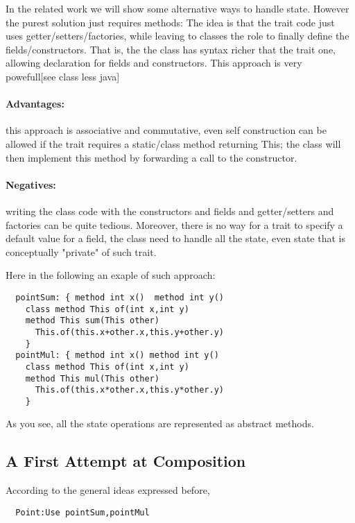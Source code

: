 In the related work we will show some alternative ways to handle state.
However the purest solution just requires methods:
  The idea is that
  the trait code just uses getter/setters/factories, while leaving
  to classes the role to finally define the fields/constructors.
  That is, the  the class has syntax richer that the trait one,
  allowing declaration for fields and constructors.
  This approach is very powefull[see class less java]
 
\paragraph*{Advantages:} 
this approach is associative and commutative, even self construction
  can be allowed if the trait requires a static/class method
  returning This; the class will then implement this method by forwarding
  a call to the constructor.
  
\paragraph*{Negatives:} writing the class code with the constructors and
   fields and getter/setters and factories can be quite tedious.
   Moreover, there is no way for a trait to specify a default value for a field,
   the class need to handle all the state, even state that is conceptually
   "private" of such trait.

Here in the following an exaple of such approach:

\begin{lstlisting}
  pointSum: { method int x()  method int y()
    class method This of(int x,int y)
    method This sum(This other)
      This.of(this.x+other.x,this.y+other.y)
    }
  pointMul: { method int x() method int y()
    class method This of(int x,int y)
    method This mul(This other)
      This.of(this.x*other.x,this.y*other.y)
    }
\end{lstlisting}

As you see, all the state operations are represented as abstract methods.

\subsection{A First Attempt at Composition}
According to the general ideas expressed before,
\begin{lstlisting}
  Point:Use pointSum,pointMul
\end{lstlisting}  

